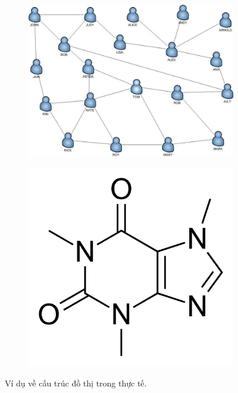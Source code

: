 \begin{figure}[H]
    \centering
    \begin{subfigure}[b]{0.4\textwidth}
        \centering
        \includegraphics[scale=0.3]{images/Chapter2/friends-graph.png}
    \end{subfigure}
    \hspace{15mm}
    \begin{subfigure}[b]{0.4\textwidth}
        \centering
        \includegraphics[scale=0.1]{images/Chapter2/caffeine_structure.png}
        \vspace*{8mm}
    \end{subfigure}
    \caption{Ví dụ về cấu trúc đồ thị trong thực tế.}
\end{figure}


